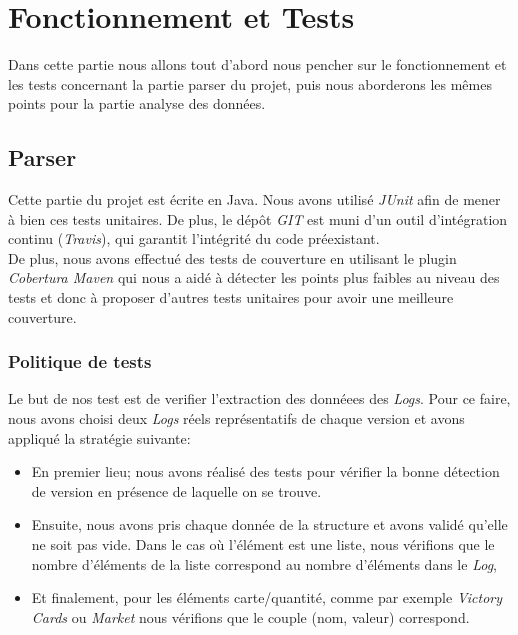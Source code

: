 \chapter{Fonctionnement et Tests}

Dans cette partie nous allons tout d'abord nous pencher sur le fonctionnement et les tests concernant la partie parser du projet, puis nous aborderons les mêmes points pour la partie analyse des données.

\section{Parser}

Cette partie du projet est écrite en Java. Nous avons utilisé \textit{JUnit} afin de mener à bien ces tests unitaires. De plus, le dépôt \textit{GIT} est muni d'un outil d'intégration continu (\textit{Travis}), qui garantit l'intégrité du code préexistant.\\

De plus, nous avons effectué des tests de couverture en utilisant le plugin \textit{Cobertura Maven} qui nous a aidé à détecter les points plus faibles au niveau des tests et donc à proposer d'autres tests unitaires pour avoir une meilleure couverture.


\subsection{Politique de tests}

Le but de nos test est de verifier l'extraction des donnéees des \textit{Logs}. Pour ce faire, nous avons choisi deux \textit{Logs} réels représentatifs de chaque version et avons appliqué la stratégie suivante:  \\
\begin{itemize}
\item En premier lieu; nous avons réalisé des tests pour vérifier la bonne détection de version en présence de laquelle on se trouve. \\
\item Ensuite, nous avons pris chaque donnée de la structure et avons validé qu'elle ne soit pas vide. Dans le cas où l'élément est une liste, nous vérifions que le nombre d'éléments de la liste correspond au nombre d'éléments dans le \textit{Log}, 
\item Et finalement, pour les éléments carte/quantité, comme par exemple \textit{Victory Cards} ou \textit{Market} nous vérifions que le couple (nom, valeur) correspond.
\end{itemize}



